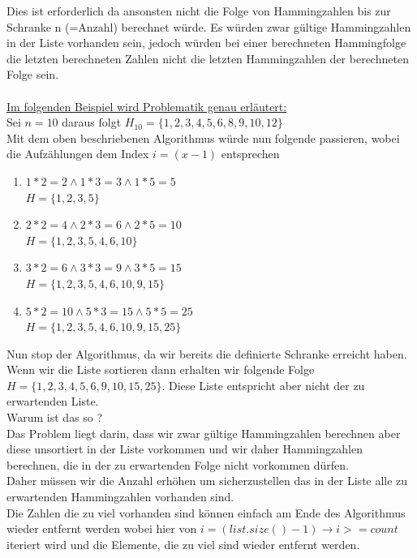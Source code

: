 \documentclass[11pt, a4paper, twoside]{article}   	%
\begin{document}
Dies ist erforderlich da ansonsten nicht die Folge von Hammingzahlen bis zur Schranke n (=Anzahl) berechnet würde. Es würden zwar gültige Hammingzahlen in der Liste vorhanden sein, jedoch würden bei einer berechneten Hammingfolge die letzten berechneten Zahlen nicht die letzten Hammingzahlen der berechneten Folge sein.\\\\
\underline{Im folgenden Beispiel wird Problematik genau erläutert:}\\
Sei $n=10$ daraus folgt $H_{10} = \{1, 2, 3, 4, 5, 6, 8, 9, 10, 12\}$\\
Mit dem oben beschriebenen Algorithmus würde nun folgende passieren, wobei die Aufzählungen dem Index $i = (x - 1)$ entsprechen 
\begin{enumerate}
	\item $1 \ast 2 = 2 \wedge 1 \ast 3 = 3 \wedge 1 \ast 5 = 5$\\
	$H = \{1, 2, 3, 5\}$
	\item $2 \ast 2 = 4 \wedge 2 \ast 3 = 6 \wedge 2 \ast 5 = 10$\\
	$H = \{1, 2, 3, 5, 4, 6, 10\}$
	\item $3 \ast 2= 6 \wedge 3 \ast 3 = 9 \wedge 3 \ast 5 = 15$\\
	$H = \{1, 2, 3, 5, 4, 6, 10, 9, 15\}$
	\item $5 \ast 2= 10 \wedge 5 \ast 3 = 15 \wedge 5 \ast 5 = 25$\\
	$H = \{1, 2, 3, 5, 4, 6, 10, 9, 15, 25\}$
\end{enumerate}
Nun stop der Algorithmus, da wir bereits die definierte Schranke erreicht haben.\\
Wenn wir die Liste sortieren dann erhalten wir folgende Folge $H = \{1, 2, 3, 4, 5, 6, 9, 10, 15, 25\}$. Diese Liste entspricht aber nicht der zu erwartenden Liste.\\
Warum ist das so ?\\
Das Problem liegt darin, dass wir zwar gültige Hammingzahlen berechnen aber diese unsortiert in der Liste vorkommen und wir daher Hammingzahlen berechnen, die in der zu erwartenden Folge nicht vorkommen dürfen.\\
Daher müssen wir die Anzahl erhöhen um sicherzustellen das in der Liste alle zu erwartenden Hammingzahlen vorhanden sind.\\
Die Zahlen die zu viel vorhanden sind können einfach am Ende des Algorithmus wieder entfernt werden wobei hier von $i = (list.size() - 1) \rightarrow i >= count$ iteriert wird und die Elemente, die zu viel sind wieder entfernt werden.\\\\
\end{document}
